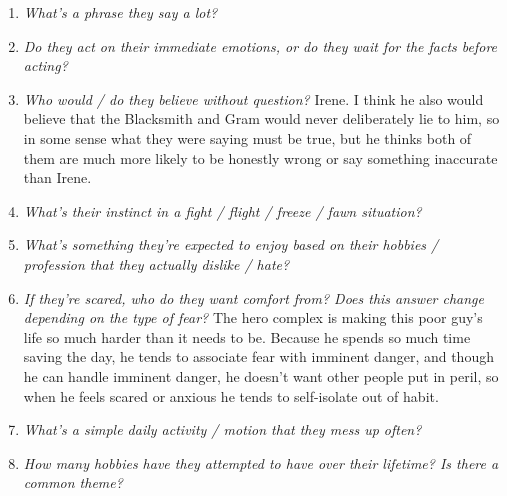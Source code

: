\begin{enumerate}
    \item\textit{What’s a phrase they say a lot?}
    \item\textit{Do they act on their immediate emotions, or do they wait for the facts before acting?}
    \item\textit{Who would / do they believe without question?}
        Irene. I think he also would believe that the Blacksmith and Gram would never deliberately lie to him, so in some sense what they were saying must be true, but he thinks both of them are much more likely to be honestly wrong or say something inaccurate than Irene.
    \item\textit{What’s their instinct in a fight / flight / freeze / fawn situation?} 
    \item\textit{What’s something they’re expected to enjoy based on their hobbies / profession that they actually dislike / hate?}
    \item\textit{If they’re scared, who do they want comfort from? Does this answer change depending on the type of fear?}
        The hero complex is making this poor guy's life so much harder than it needs to be. Because he spends so much time saving the day, he tends to associate fear with imminent danger, and though he can handle imminent danger, he doesn't want other people put in peril, so when he feels scared or anxious he tends to self-isolate out of habit. 
    \item\textit{What’s a simple daily activity / motion that they mess up often?}
    \item\textit{How many hobbies have they attempted to have over their lifetime? Is there a common theme?}
  \end{enumerate}